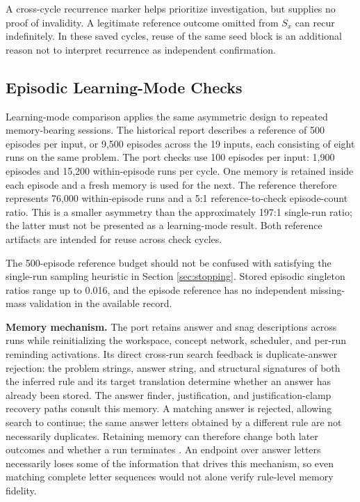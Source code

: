 \documentclass[10pt,letterpaper]{article}
\begin{document}
A cross-cycle recurrence marker helps prioritize investigation, but supplies no proof of
invalidity. A legitimate reference outcome omitted from \(S_x\) can recur indefinitely. In
these saved cycles, reuse of the same seed block is an additional reason not to interpret
recurrence as independent confirmation.

\subsection{Episodic Learning-Mode Checks}\label{sec:episodic-results}

Learning-mode comparison applies the same asymmetric design to repeated memory-bearing
sessions. The historical report describes a reference of 500 episodes per input, or 9,500
episodes across the 19 inputs, each consisting of eight runs on the same problem. The port
checks use 100 episodes per input: 1,900 episodes and 15,200 within-episode runs per
cycle. One memory is retained inside each episode and a fresh memory is used for the next.
The reference therefore represents 76,000 within-episode runs and a 5:1 reference-to-check
episode-count ratio. This is a smaller asymmetry than the approximately 197:1 single-run
ratio; the latter must not be presented as a learning-mode result. Both reference
artifacts are intended for reuse across check cycles.

The 500-episode reference budget should not be confused with satisfying the single-run
sampling heuristic in Section \ref{sec:stopping}. Stored episodic singleton ratios range
up to 0.016, and the episode reference has no independent missing-mass validation in the
available record.

\textbf{Memory mechanism.} The port retains answer and snag descriptions across runs while
reinitializing the workspace, concept network, scheduler, and per-run reminding
activations. Its direct cross-run search feedback is duplicate-answer rejection: the
problem strings, answer string, and structural signatures of both the inferred rule and
its target translation determine whether an answer has already been stored. The answer
finder, justification, and justification-clamp recovery paths consult this memory. A
matching answer is rejected, allowing search to continue; the same answer letters obtained
by a different rule are not necessarily duplicates. Retaining memory can therefore change
both later outcomes and whether a run terminates \citep{ref21, ref22}. An endpoint over
answer letters necessarily loses some of the information that drives this mechanism, so
even matching complete letter sequences would not alone verify rule-level memory fidelity.
\end{document}
